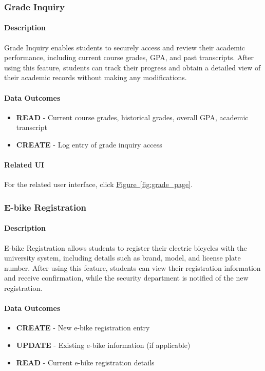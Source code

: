 \documentclass[12pt]{article}
\begin{document}
\subsubsection{Grade Inquiry}

\paragraph{Description}
Grade Inquiry enables students to securely access and review their academic performance, including current course grades, GPA, and past transcripts. After using this feature, students can track their progress and obtain a detailed view of their academic records without making any modifications.

\paragraph{Data Outcomes}
\begin{itemize}
    \item \textbf{READ} - Current course grades, historical grades, overall GPA, academic transcript
    \item \textbf{CREATE} - Log entry of grade inquiry access
\end{itemize}

\paragraph{Related UI}
For the related user interface, click \hyperref[fig:grade_page]{Figure~\ref*{fig:grade_page}}.

\subsubsection{E-bike Registration}

\paragraph{Description}
E-bike Registration allows students to register their electric bicycles with the university system, including details such as brand, model, and license plate number. After using this feature, students can view their registration information and receive confirmation, while the security department is notified of the new registration.

\paragraph{Data Outcomes}
\begin{itemize}
    \item \textbf{CREATE} - New e-bike registration entry
    \item \textbf{UPDATE} - Existing e-bike information (if applicable)
    \item \textbf{READ} - Current e-bike registration details
\end{itemize}
\end{document}
